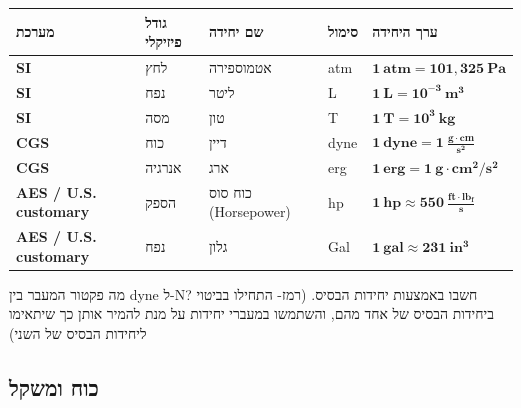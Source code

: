 \documentclass[
  hebrew,
  letterpaper,
  DIV=11,
  numbers=noendperiod]{scrreprt}
\begin{document}
\begin{longtable}[]{@{}
  >{\centering\arraybackslash}p{}
  >{\centering\arraybackslash}p{}
  >{\centering\arraybackslash}p{}
  >{\centering\arraybackslash}p{}
  >{\centering\arraybackslash}p{}@{}}
\toprule\noalign{}
\begin{minipage}[b]{\linewidth}\centering
\textbf{מערכת}
\end{minipage} & \begin{minipage}[b]{\linewidth}\centering
\textbf{גודל פיזיקלי}
\end{minipage} & \begin{minipage}[b]{\linewidth}\centering
\textbf{שם יחידה}
\end{minipage} & \begin{minipage}[b]{\linewidth}\centering
\textbf{סימול}
\end{minipage} & \begin{minipage}[b]{\linewidth}\centering
\textbf{ערך היחידה}
\end{minipage} \\
\midrule\noalign{}
\endhead
\bottomrule\noalign{}
\endlastfoot
\textbf{SI} & לחץ & אטמוספירה & atm &
\(\mathbf{1\ atm = 101{,}325\ Pa}\) \\
\textbf{SI} & נפח & ליטר & L & \(\mathbf{1\ L = 10^{-3}\ m^{3}}\) \\
\textbf{SI} & מסה & טון & T & \(\mathbf{1\ T = 10^{3}\ kg}\) \\
\textbf{CGS} & כוח & דיין & dyne &
\(\mathbf{1\ dyne = 1\ \frac{g \cdot cm}{s^{2}}}\) \\
\textbf{CGS} & אנרגיה & ארג & erg &
\(\mathbf{1\ erg = 1\ g \cdot cm^{2}/s^{2}}\) \\
\textbf{AES / U.S. customary} & הספק & כוח סוס (Horsepower) & hp &
\(\mathbf{1\ hp \approx 550\ \frac{ft \cdot lb_{f}}{s}}\) \\
\textbf{AES / U.S. customary} & נפח & גלון & Gal &
\(\mathbf{1\ gal \approx 231\ in^{3}}\) \\
\end{longtable}

{מה פקטור המעבר בין} dyne {ל-}N{? חשבו באמצעות יחידות הבסיס.} {(רמז-
התחילו בביטוי ביחידות הבסיס של אחד מהם, והשתמשו במעברי יחידות על מנת
להמיר אותן כך שיתאימו ליחידות הבסיס של השני)}

\subsection{\texorpdfstring{{כוח
ומשקל}}{כוח ומשקל}}\label{ux5dbux5d5ux5d7-ux5d5ux5deux5e9ux5e7ux5dc}
\end{document}

